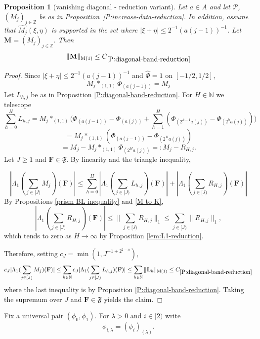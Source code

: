 \documentclass[12pt,reqno]{amsart}
\theoremstyle{plain}
\newtheorem{proposition}[theorem]{Proposition}
\numberwithin{equation}{section}
\theoremstyle{remark}
\newcommand{\using}[1]{}
\newcommand{\Z}{{\mathbb Z}}
\newcommand{\N}{{\mathbb N}}
\newcommand{\F}{\mathbf{F}}
\begin{document}
\begin{proposition}[vanishing diagonal - reduction variant]
\label{P:vanishing-diagonal-reduction}\using{P:diagonal-band-reduction}\using{prism BL inequality}\using{M to K}\using{lem:L1-reduction}
Let $a\in A$ and let $\mathcal P$, $(M_j)_{j\in \Z}$ be as in Proposition~\ref{P:increase-data-reduction}. In addition, assume that $\widehat{M_j}(\xi,\eta)$ is supported in the set where $|\xi+\eta| \leq 2^{-1} (a(j-1))^{-1}$.
Let $\mathbf{M}=(M_j)_{j\in \Z}$. Then
\begin{equation}\label{auto:vanishing-diagonal-M-bound}
\|\mathbf{M}\|_{\rm M(1)} \leq C_{\ref{P:diagonal-band-reduction}}
\end{equation}
\end{proposition}

\begin{proof}Since    $|\xi+\eta|\le 2^{-1} (a(j-1))^{-1}$ and   $\widehat{\Phi}=1$ on $[-1/2,1/2]$,
\[M_j*_{(1,1)}\Phi_{(a(j-1))}=M_j\]
Let $L_{h,j}$ be as in Proposition \ref{P:diagonal-band-reduction}. For $H\in \N$ we telescope
\[\sum_{h=0}^H L_{h,j} = M_j*_{(1,1)} \Big( \Phi_{(a(j-1))}-\Phi_{(a(j))} + \sum_{h=1}^{H}
( \Phi_{(2^{h-1}a(j))} - \Phi_{(2^ha(j))} ) \Big)\]
\[= M_j*_{(1,1)} ( \Phi_{(a(j-1))} - \Phi_{(2^Ha(j))} )\]
\[= M_j-M_j*_{(1,1)}\Phi_{(2^Ha(j))} =: M_j-R_{H,j}.\]
Let $J\ge 1$ and $\F\in \mathfrak{F}$. By linearity and the triangle inequality,

\[|\Lambda_1 (\sum_{j\in [J)} M_j )(\F)| \le  \sum_{h=0}^H |\Lambda_1( \sum_{j\in [J)}L_{h,j})(\F)| + |\Lambda_1( \sum_{j\in [J)}R_{H,j})(\F)| \]
By Propositions  \ref{prism BL inequality} and \ref{M to K},
\[|\Lambda_1( \sum_{j\in [J)}R_{H,j})(\F)| \le \|\sum_{j\in [J)}R_{H,j}\|_1 \le \sum_{j\in [J)}\|R_{H,j}\|_1,\]
which tends to zero as $H\to \infty$ by Proposition \ref{lem:L1-reduction}.

Therefore, setting $c_J = \min(1,J^{-1+2^{2-n}})$,
\[c_J |\Lambda_1 (\sum_{j\in [J)} M_j )(\F)| \le  \sum_{h\in\N} c_J |\Lambda_1( \sum_{j\in [J)}L_{h,j})(\F)|\le \sum_{h\in \N} \|\mathbf{L}_h\|_{\rm M(1)} \le C_{\ref{P:diagonal-band-reduction}}\]
where the last inequality is by Proposition
\ref{P:diagonal-band-reduction}. Taking the supremum over
$J$ and $\mathbf F\in\mathfrak F$ yields the claim.
\end{proof}

Fix a universal pair $(\phi_0,\phi_1)$. For $\lambda>0$ and $i\in[2)$ write
\begin{equation}\label{auto:rescaled-window-continuous-notation} \phi_{i,\lambda} = (\phi_i)_{(\lambda)}. \end{equation}
\end{document}
